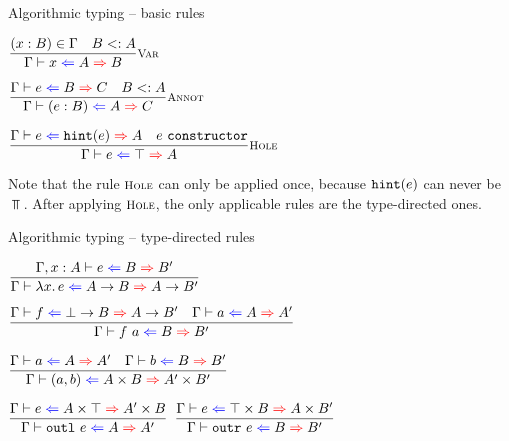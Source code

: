 \documentclass{beamer}
\begin{document}
\begin{frame}{Algorithmic typing -- basic rules}

\begin{center}
  $\infrule[Var]{\sidecond{(x : B) \in \Gamma} \quad \sidecond{\subtyping{B}{A}}}{\hinting{x}{A}{B}}$

  \vspace{2em}

  $\infrule[Annot]{\hinting{e}{B}{C} \quad \sidecond{\subtyping{B}{A}}}{\hinting{\annot{e}{B}}{A}{C}}$

  \vspace{2em}

  $\infrule[Hole]{\hinting{e}{\hintfor{e}}{A} \quad \sidecond{e\ \texttt{constructor}}}{\hinting{e}{\Top}{A}}$
\end{center}

\vspace{2em}

Note that the rule $\textsc{\footnotesize{Hole}}$ can only be applied once, because $\texttt{hint}(e)$ can never be $\Top$. After applying $\textsc{\footnotesize{Hole}}$, the only applicable rules are the type-directed ones.

\end{frame}

\begin{frame}{Algorithmic typing -- type-directed rules}

\begin{center}
  $\infrule{\fullhinting{\extend{\Gamma}{x}{A}}{e}{B}{B'}}{\hinting{\fun{x}{e}}{\Fun{A}{B}}{\Fun{A}{B'}}}$

  \vspace{2em}

  $\infrule{\hinting{f}{\Fun{\Bot}{B}}{\Fun{A}{B'}} \quad \hinting{a}{A}{A'}}{\hinting{\app{f}{a}}{B}{B'}}$

  \vspace{2em}

  $\infrule{\hinting{a}{A}{A'} \quad \hinting{b}{B}{B'}}{\hinting{\pair{a}{b}}{\Prod{A}{B}}{\Prod{A'}{B'}}}$

  \vspace{2em}

  $\infrule{\hinting{e}{\Prod{A}{\Top}}{\Prod{A'}{B}}}{\hinting{\outl{e}}{A}{A'}}$ \quad
  $\infrule{\hinting{e}{\Prod{\Top}{B}}{\Prod{A}{B'}}}{\hinting{\outr{e}}{B}{B'}}$
\end{center}

\end{frame}
\end{document}
